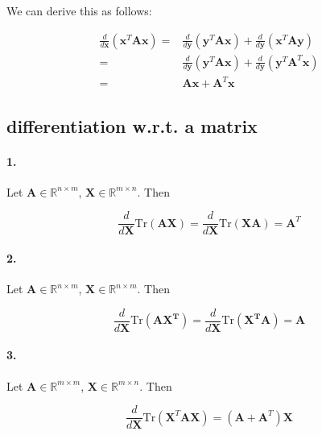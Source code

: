 \documentclass{article}
\begin{document}
\begin{appendices}
We can derive this as follows:

\[
\begin{split}
    \frac{d}{d\mathbf{x}} (\mathbf{x}^{T}\mathbf{A}\mathbf{x}) =& \frac{d}{d\mathbf{y}} (\mathbf{y}^{T}\mathbf{A}\mathbf{x}) + \frac{d}{d\mathbf{y}} (\mathbf{x}^{T}\mathbf{A}\mathbf{y})\\
    =& \frac{d}{d\mathbf{y}} (\mathbf{y}^{T}\mathbf{A}\mathbf{x}) + \frac{d}{d\mathbf{y}} (\mathbf{y}^T\mathbf{A}^{T}\mathbf{x})\\
    =& \mathbf{A}\mathbf{x} + \mathbf{A}^T\mathbf{x}
\end{split}
\]


\subsection{differentiation w.r.t. a matrix}

\paragraph{1.} Let $\mathbf{A} \in \mathbb{R}^{n\times m}$, $\mathbf{X} \in \mathbb{R}^{m\times n}$. Then

\begin{equation}
    \frac{d}{d\mathbf{X}}\text{Tr}(\mathbf{AX}) = \frac{d}{d\mathbf{X}}\text{Tr}(\mathbf{XA}) = \mathbf{A}^T
\end{equation}

\paragraph{2.} Let $\mathbf{A} \in \mathbb{R}^{n\times m}$, $\mathbf{X} \in \mathbb{R}^{n\times m}$. Then

\begin{equation}
    \frac{d}{d\mathbf{X}}\text{Tr}(\mathbf{AX^T}) = \frac{d}{d\mathbf{X}}\text{Tr}(\mathbf{X^TA}) = \mathbf{A}
\end{equation}


\paragraph{3.} Let $\mathbf{A} \in \mathbb{R}^{m\times m}$, $\mathbf{X} \in \mathbb{R}^{m\times n}$. Then

\begin{equation}
    \frac{d}{d\mathbf{X}} \text{Tr}(\mathbf{X}^T \mathbf{A} \mathbf{X}) = (\mathbf{A} + \mathbf{A}^T) \mathbf{X}
\end{equation}


\end{appendices}
\end{document}
